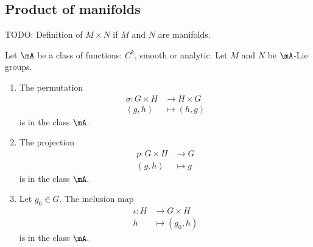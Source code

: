 \subsection{Product of manifolds}

\begin{definition}      \label{DEFooYOLXooDPrnHa}
    TODO: Definition of \( M\times N\) if \( M\) and \( N\) are manifolds.
\end{definition}

\begin{proposition}      \label{PROPooCHVLooVFScOl}
    Let \( \mA\) be a class of functions: \( C^k\), smooth or analytic.  Let \( M\) and \( N\) be \( \mA\)-Lie groups.
    \begin{enumerate}
        \item
            The permutation
            \begin{equation}
                \begin{aligned}
                    \sigma\colon G\times H&\to H\times G \\
                    (g,h)&\mapsto (h,g) 
                \end{aligned}
            \end{equation}
            is in the class \( \mA\).
        \item
            The projection
            \begin{equation}
                \begin{aligned}
                    p\colon G\times H&\to G \\
                    (g,h)&\mapsto g 
                \end{aligned}
            \end{equation}
            is in the class \( \mA\).
        \item
            Let \( g_0\in G\). The inclusion map
            \begin{equation}
                \begin{aligned}
                    \iota\colon H&\to G\times H \\
                    h&\mapsto (g_0,h) 
                \end{aligned}
            \end{equation}
            is in the class \( \mA\).
    \end{enumerate}
\end{proposition}

